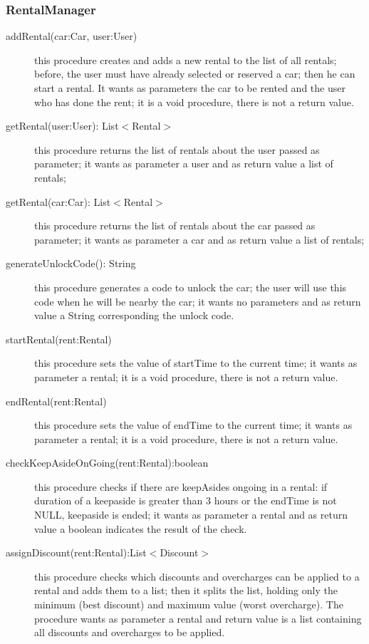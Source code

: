 \documentclass{scrreprt}
\begin{document}
\subsubsection{RentalManager}

\begin{description}
\item[addRental(car:Car, user:User)] this procedure creates and adds a new rental to the list of all rentals; before, the user must have already selected or reserved a car; then he can start a rental. It wants as parameters the car to be rented and the user who has done the rent; it is a void procedure, there is not a return value.
\item[getRental(user:User): List$<$Rental$>$] this procedure returns the list of rentals about the user passed as parameter; it wants as parameter a user and as return value a list of rentals;
\item[getRental(car:Car): List$<$Rental$>$] this procedure returns the list of rentals about the car passed as parameter; it wants as parameter a car and as return value a list of rentals;
\item[generateUnlockCode(): String] this procedure generates a code to unlock the car; the user will use this code when he will be nearby the car; it wants no parameters and as return value a String corresponding the unlock code.
\item[startRental(rent:Rental)] this procedure sets the value of startTime to the current time; it wants as parameter a rental; it is a void procedure, there is not a return value.
\item[endRental(rent:Rental)] this procedure sets the value of endTime to the current time; it wants as parameter a rental; it is a void procedure, there is not a return value.
\item[checkKeepAsideOnGoing(rent:Rental):boolean] this procedure checks if there are keepAsides ongoing in a rental: if duration of a keepaside is greater than 3 hours or the endTime is not NULL, keepaside is ended; it wants as parameter a rental and as return value a boolean indicates the result of the check.
\item[assignDiscount(rent:Rental):List$<$Discount$>$] this procedure checks which discounts and overcharges can be applied to a rental and adds them to a list; then it splits the list, holding only the minimum (best discount) and maximum value (worst overcharge). The procedure wants as parameter a rental and return value is a list containing all discounts and overcharges to be applied.
\end{description}
\end{document}
